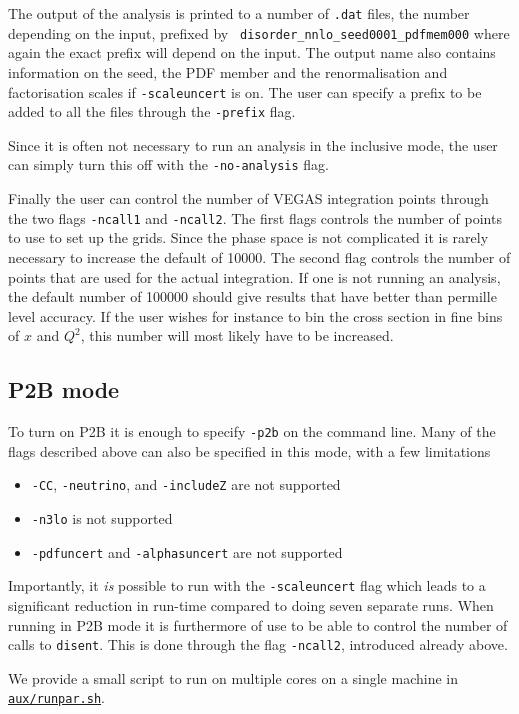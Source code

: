 \documentclass[submission, PhysCodeb]{SciPost_better_arXiv}
\newcommand{\disent}{{\tt disent}}
\newcommand{\ttt}[1]{\texttt{#1}}
\newcommand{\repolink}[2]{\href{https://github.com/alexanderkarlberg/disorder/blob/master/#1}{\ttt{#2}}}
\newcommand{\masterlink}[1]{\repolink{#1}{#1}}
\begin{document}
The output of the analysis is printed to a number of {\tt .dat} files,
the number depending on the input, prefixed by {\tt
  disorder\_nnlo\_seed0001\_pdfmem000} where again the exact prefix
will depend on the input. The output name also contains information on
the seed, the PDF member and the renormalisation and factorisation
scales if {\tt -scaleuncert} is on. The user can specify a prefix to
be added to all the files through the {\tt -prefix} flag.

Since it is often not necessary to run an analysis in the inclusive
mode, the user can simply turn this off with the {\tt -no-analysis}
flag.

Finally the user can control the number of VEGAS integration points
through the two flags {\tt -ncall1} and {\tt -ncall2}. The first flags
controls the number of points to use to set up the grids. Since the
phase space is not complicated it is rarely necessary to increase the
default of 10000. The second flag controls the number of points that
are used for the actual integration. If one is not running an
analysis, the default number of 100000 should give results that have
better than permille level accuracy. If the user wishes for instance
to bin the cross section in fine bins of $x$ and $Q^2$, this number
will most likely have to be increased.

\subsection{P2B mode}
\label{sec:P2Bmode}
To turn on P2B it is enough to specify {\tt -p2b} on the command
line. Many of the flags described above can also be specified in this
mode, with a few limitations
\begin{itemize}
\item {\tt -CC}, {\tt -neutrino}, and {\tt -includeZ} are not supported
\item {\tt -n3lo} is not supported
\item {\tt -pdfuncert} and {\tt -alphasuncert} are not supported
\end{itemize}
Importantly, it \emph{is} possible to run with the {\tt -scaleuncert}
flag which leads to a significant reduction in run-time compared to
doing seven separate runs. When running in P2B mode it is furthermore of
use to be able to control the number of calls to \disent{}. This is
done through the flag {\tt -ncall2}, introduced already above. 

We provide a small script to run on multiple cores on a single machine
in \masterlink{aux/runpar.sh}.
\end{document}
